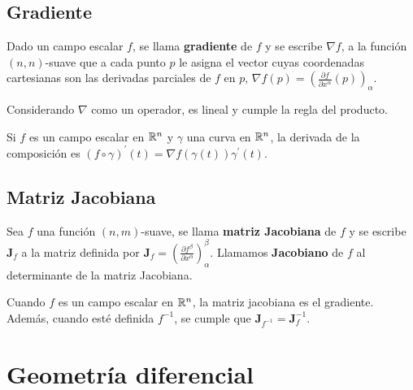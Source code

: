 \section{Gradiente}\label{sec:gradiente}
\begin{definition}
  Dado un campo escalar $f$, se llama \textbf{gradiente}\label{def:gradiente} de $f$ y se escribe $\nabla
  f$, a la función $(n,n)$-suave que a cada punto $p$ le asigna el vector cuyas
  coordenadas cartesianas son las derivadas parciales de $f$ en $p$, $\nabla f(p)=\left({\frac
  {\partial f}{\partial x^\alpha}}(p)\right)_\alpha$.
\end{definition}

Considerando $\nabla$ como un operador, es lineal y cumple la regla del producto.

\begin{theorem}\label{th:regla-cadena}
  Si $f$ es un campo escalar en $\mathbb{R}^n$ y $\gamma$ una curva en $\mathbb{R}^n$, la derivada de la composición
es $(f\circ\gamma)^{'}(t)=\nabla f(\gamma(t))\gamma^{'}(t)$.
\end{theorem}

\section{Matriz Jacobiana}\label{sec:matriz-jacobiana}
\begin{definition}
  Sea $f$ una función $(n,m)$-suave, se llama \textbf{matriz
  Jacobiana}\label{def:matriz-jacobiana} de $f$ y se escribe $\mathbf{J}_f$ a la matriz
  definida por
  $\mathbf{J}_f=\left({\frac {\partial f^\beta}{\partial x^\alpha}}\right)_\alpha^\beta$.
  Llamamos \textbf{Jacobiano}\label{def:jacobiano} de $f$ al determinante de la matriz Jacobiana.
\end{definition}
Cuando $f$ es un campo escalar en $\mathbb{R}^n$, la matriz jacobiana es el gradiente.
Además, cuando esté definida $f^{-1}$, se cumple que $\mathbf{J}_{f^{-1}}=\mathbf{J}_f^{-1}$.


\chapter{Geometría diferencial}\label{ch:geometria-diferencial}
